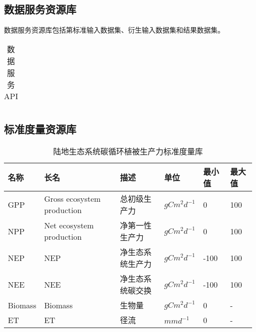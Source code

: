 \subsection{数据服务资源库}

数据服务资源库包括第标准输入数据集、衍生输入数据集和结果数据集。

\begin{table}
    \centering
    \caption{数据服务API}
    \label{tab:model-service-API}
    \begin{threeparttable}
        \begin{tabu} to 1
            \toprule[1.5pt]
            \midrule[1.5pt]
            \bottomrule[1.5pt]
        \end{tabu}
    \end{threeparttable}
\end{table}

\subsection{标准度量资源库}



\begin{table}[!htbp]
    \centering
    \caption{陆地生态系统碳循环植被生产力标准度量库}
    \label{tab:std-metrics}
    \begin{threeparttable}
        \begin{tabu}{ X[l m] X[5 l m] X[4 l m] X[l m] X[c m] X[c m]}
            \toprule[1.5pt]
            \textbf{名称} & \textbf{长名} & \textbf{描述} & \textbf{单位} & \textbf{最小值} & \textbf{最大值}  \\
            \midrule[1.5pt]
            GPP & Gross ecosystem production & 总初级生产力 & $gC m^2 d^{-1}$ & 0 & 100 \\
            NPP & Net ecosystem production & 净第一性生产力 & $gC m^2 d^{-1}$ & 0 & 100 \\
            NEP & NEP & 净生态系统生产力 & $gC m^2 d^{-1}$ & -100 & 100 \\
            NEE & NEE & 净生态系统碳交换 & $gC m^2 d^{-1}$ & -100 & 100 \\
            Biomass & Biomass & 生物量 & $gC m^2 d^{-1}$ & 0 & - \\
            ET & ET & 径流 & $mm d^{-1}$ & 0 & - \\
            \bottomrule[1.5pt]
        \end{tabu}
    \end{threeparttable}
\end{table}

